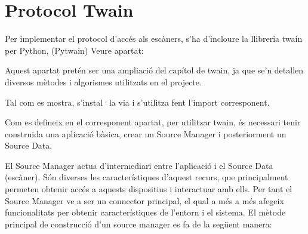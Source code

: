 \documentclass[letterpaper,11pt,catalan]{sphinxmanual}
\begin{document}
\section{Protocol Twain}
\label{\detokenize{index:protocol-twain}}
Per implementar el protocol d'accés als escàners, s'ha d'incloure la llibreria twain per
Python, (Pytwain) Veure apartat: {\hyperref[\detokenize{index:reference-twain}]{}}

Aquest apartat pretén ser una ampliació del capítol de twain, ja que se'n detallen diversos
mètodes i algorismes utilitzats en el projecte.

Tal com es mostra, s'instal·la via  i s'utilitza fent l'import corresponent.

\begin{sphinxVerbatim}[commandchars=\\\{\}]
  
 
\end{sphinxVerbatim}

Com es defineix en el corresponent apartat, per utilitzar twain, és necessari tenir
construida una aplicació bàsica, crear un Source Manager i posteriorment un Source Data.

El Source Manager actua d'intermediari entre l'aplicació i el Source Data (escàner).
Són diverses les característiques d'aquest recurs, que principalment permeten obtenir
accés a aquests dispositius i interactuar amb ells. Per tant el Source Manager ve a ser un connector principal,
el qual a més a més afegeix funcionalitats per obtenir característiques de l'entorn i el sistema.
El mètode principal de construcció d'un source manager es fa de la següent manera:

\begin{sphinxVerbatim}[commandchars=\\\{\}]
  
\end{sphinxVerbatim}
\end{document}
